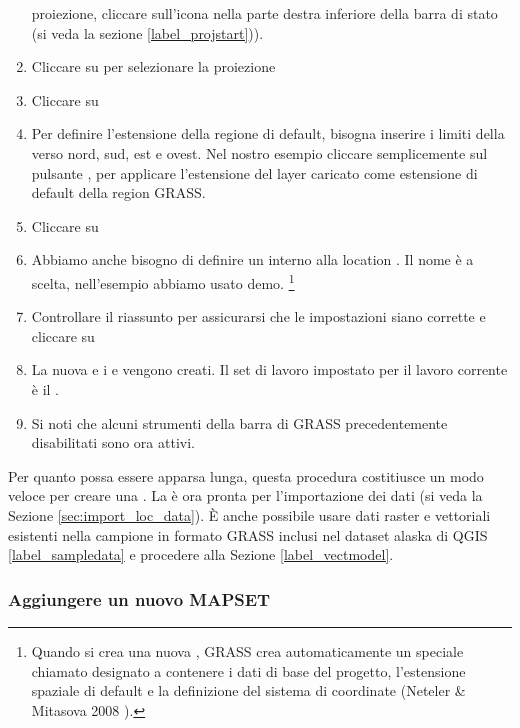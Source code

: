 \begin{enumerate}
  proiezione, cliccare sull'icona   
  nella parte destra inferiore della barra di stato (si veda la sezione \ref{label_projstart})).
  \item Cliccare su  per selezionare la proiezione
  \item Cliccare su  
  \item Per definire l'estensione della regione di default, bisogna inserire i
  limiti della  verso nord, sud, est e ovest. Nel nostro
  esempio cliccare semplicemente sul pulsante , per applicare l'estensione del layer caricato
   come estensione di default della region GRASS.
  \item Cliccare su  
  \item Abbiamo anche bisogno di definire un  interno alla
  location . Il nome è a scelta, nell'esempio abbiamo
  usato demo.
  \footnote{Quando si crea una nuova , GRASS crea
  automaticamente un  speciale chiamato 
  designato a contenere i dati di base del progetto, l'estensione spaziale di
  default e la definizione del sistema di coordinate (Neteler \& Mitasova 2008 
  \cite{neteler_mitasova08}).}
  \item Controllare il riassunto per assicurarsi che le impostazioni siano
  corrette e cliccare su  
  \item La nuova  e i 
  e  vengono creati. Il set di lavoro impostato per il
  lavoro corrente è il .
  \item Si noti che alcuni strumenti della barra di GRASS precedentemente
  disabilitati sono ora attivi.
\end{enumerate}

Per quanto possa essere apparsa lunga, questa procedura costitiusce un modo
veloce per creare una . La  è ora
pronta per l'importazione dei dati (si veda la Sezione \ref{sec:import_loc_data}).
È anche possibile usare dati raster e vettoriali esistenti nella
 campione in formato GRASS inclusi nel dataset
alaska di QGIS \ref{label_sampledata} e procedere alla Sezione \ref{label_vectmodel}.

\subsubsection{Aggiungere un nuovo MAPSET}\label{sec:add_mapset}

